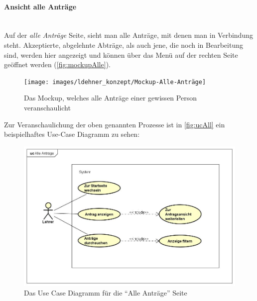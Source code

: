 \paragraph{Ansicht alle Anträge}
~\\
Auf der \textit{alle Anträge} Seite, sieht man alle Anträge, mit denen man in Verbindung steht. Akzeptierte, abgelehnte Abträge, als auch jene, die noch in Bearbeitung sind, werden hier angezeigt und können über das Menü auf der rechten Seite geöffnet werden (\autoref{fig:mockupAlle}).
\begin{figure}[H]
	\centering
	\texttt{[image: images/ldehner\_konzept/Mockup-Alle-Anträge]}
	\caption[Mockup Alle Anträge]{Das Mockup, welches alle Anträge einer gewissen Person veranschaulicht}
	\label{fig:mockupAlle}
\end{figure}
Zur Veranschaulichung der oben genannten Prozesse ist in \autoref{fig:ucAll} ein beispielhaftes Use-Case Diagramm zu sehen: 
\begin{figure}[H]
	\centering
	\includegraphics[width=1\linewidth]{images/ldehner_konzept/uc-all}
	\caption[Use Case Diagramm Alle Anträge]{Das Use Case Diagramm für die \enquote{Alle Anträge} Seite}
	\label{fig:ucAll}
\end{figure}
\newpage
